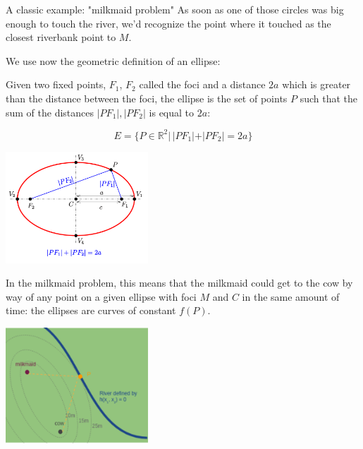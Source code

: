 \documentclass[11pt,compress,t,notes=noshow, xcolor=table]{beamer}
\begin{document}
\begin{vbframe}{A classic example: "milkmaid problem"}
As soon as one of those circles was big enough to touch the river, we'd recognize the point where it touched as the closest riverbank point to $M$. 

\framebreak 

We use now the geometric definition of an ellipse: 

Given two fixed points, $F_1$, $F_2$ called the foci and a distance $2a$ which is greater than the distance between the foci, the ellipse is the set of points $P$ such that the sum of the distances $|PF_1|, |PF_2|$ is equal to $2a$: 

$$
E = \{ P \in \mathbb{R}^2 | \, |PF_1| + |PF_2| = 2a \}
$$

\vspace*{0.2cm} 

\begin{center}
	\includegraphics[width = 0.4\textwidth]{figure_man/ellipse.png}
\end{center}

\framebreak 




In the milkmaid problem, this means that the milkmaid could get to the cow by way of any point on a given ellipse with foci $M$ and $C$ in the same amount of time: the ellipses are curves of constant $f(P)$. 

\vspace*{0.2cm} 

\begin{center}
	\includegraphics[width = 0.4\textwidth]{figure_man/milkmaid4.png}
\end{center}



\end{vbframe}
\end{document}
